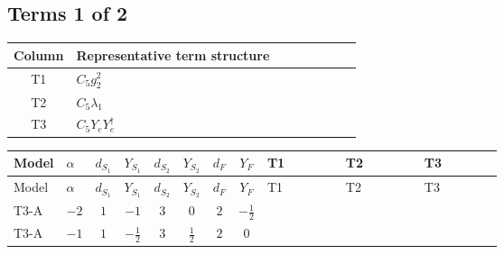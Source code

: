 \documentclass[8pt]{article}
\begin{document}
\begin{landscape}
\subsection*{Terms 1 of 2}
\begin{center}
\begin{tabular}{@{}c >{\raggedright\arraybackslash}p{0.82\linewidth}@{}}
\toprule
Column & Representative term structure \\
\midrule
T1 & \(\displaystyle C_{5} g_{2}^{2}\) \\
\midrule
T2 & \(\displaystyle C_{5} \lambda_1\) \\
\midrule
T3 & \(\displaystyle C_{5} Y_e Y_e^\dagger\) \\
\midrule
\bottomrule
\end{tabular}
\end{center}
\smallskip
\tiny
\begin{longtable}{@{}llcccccc >{\raggedright\arraybackslash}p{0.21\linewidth} >{\raggedright\arraybackslash}p{0.21\linewidth} >{\raggedright\arraybackslash}p{0.21\linewidth}@{}}
\toprule
Model & $\alpha$ & $d_{S_1}$ & $Y_{S_1}$ & $d_{S_2}$ & $Y_{S_2}$ & $d_F$ & $Y_F$ & T1 & T2 & T3 \\
\midrule
\endfirsthead
\toprule
Model & $\alpha$ & $d_{S_1}$ & $Y_{S_1}$ & $d_{S_2}$ & $Y_{S_2}$ & $d_F$ & $Y_F$ & T1 & T2 & T3 \\
\midrule
\endhead
T3-A & $-2$ & $1$ & $-1$ & $3$ & $0$ & $2$ & $-\frac{1}{2}$ & \scriptsize\adjustbox{max width=\linewidth}{$\begin{gathered} - 3 C_{5} g_{2}^{2}\end{gathered}$} & \scriptsize\adjustbox{max width=\linewidth}{$\begin{gathered} 2 C_{5} \lambda_1\end{gathered}$} & \scriptsize\adjustbox{max width=\linewidth}{$\begin{gathered} - C_{5} Y_e Y_e^\dagger\end{gathered}$} \\
\midrule
T3-A & $-1$ & $1$ & $-\frac{1}{2}$ & $3$ & $\frac{1}{2}$ & $2$ & $0$ & \scriptsize\adjustbox{max width=\linewidth}{$\begin{gathered} - 3 C_{5} g_{2}^{2}\end{gathered}$} & \scriptsize\adjustbox{max width=\linewidth}{$\begin{gathered} 2 C_{5} \lambda_1\end{gathered}$} & \scriptsize\adjustbox{max width=\linewidth}{$\begin{gathered} - C_{5} Y_e Y_e^\dagger\end{gathered}$} \\

\end{longtable}
\end{landscape}
\end{document}

